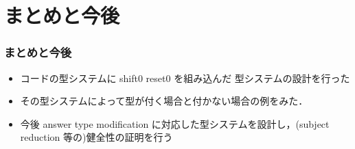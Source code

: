 \documentclass[dvipdfmx,cjk,xcolor=dvipsnames,envcountsect,notheorems,12pt]{beamer}
\newcommand\cfun[2]{\underline{\lambda}{#1}.{#2}}
\newcommand\cResetz{\underline{\textbf{reset0}}}
\newcommand\cShiftz{\underline{\textbf{shift0}}}
\newcommand\cThrow{\underline{\textbf{throw}}}
\newcommand\cresetz[1]{\cResetz~{#1}}
\newcommand\cshiftz[2]{\cShiftz~{#1}\to{#2}}
\newcommand\cthrow[2]{\cThrow~{#1}~{#2}}
\newcommand\cLet{\underline{\textbf{clet}}}
\newcommand\cIn{\underline{\textbf{in}}}
\newcommand\clet[3]{\cLet~{#1}={#2}~\cIn~{#3}}
\newcommand\codeT[2]{\langle{#1}\rangle^{#2}}
\newcommand\contT[2]{({#1} \Rightarrow {#2})}
\newcommand\ord{\ge}
\theoremstyle{definition}
\begin{document}






\section{まとめと今後}
\begin{frame}
  \frametitle{まとめと今後}
  \begin{itemize}
  \item コードの型システムに shift0 reset0 を組み込んだ 型システムの設計を行った
  \item その型システムによって型が付く場合と付かない場合の例をみた．
  \item 今後 answer type modification に対応した型システムを設計し，(subject reduction 等の)健全性の証明を行う
  \end{itemize}
\end{frame}
\end{document}
